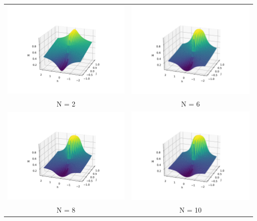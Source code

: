 \documentclass{article}
\begin{document}
\begin{itemize}
    \hskip-4.5cm\begin{tabular}{c c}
        \includegraphics[width = .7 \textwidth]{TFIM_3D_N=2.pdf} &  \includegraphics[width = .7 \textwidth]{TFIM_3D_N=6.pdf}\\
        N = 2& N = 6\\
        \includegraphics[width = .7 \textwidth]{TFIM_3D_N=8.pdf} &  \includegraphics[width = .7 \textwidth]{TFIM_3D_N=10.pdf}\\
         N = 8 & N = 10 
    \end{tabular}
\end{itemize}
\end{document}
